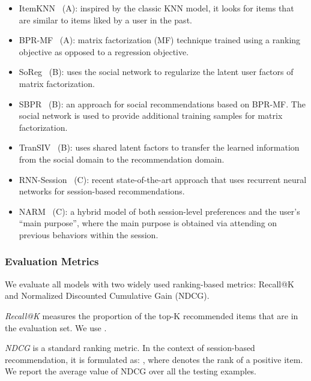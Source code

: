 \documentclass[sigconf]{acmart}
\begin{document}
\begin{itemize}[leftmargin=0.2in]
\item ItemKNN~\cite{linden2003amazon} (A): inspired by the classic KNN model, it looks for items that are similar to items liked by a user in the past.
\item BPR-MF~\cite{rendle2009bpr} (A): matrix factorization (MF) technique trained using a ranking objective as opposed to a regression objective.
\item SoReg~\cite{ma2011recommender} (B): uses the social network to regularize the latent user factors of matrix factorization.
\item SBPR~\cite{zhao2014leveraging} (B): an approach for social recommendations based on BPR-MF. The social network is used to provide additional training samples for matrix factorization.
\item TranSIV~\cite{xiao2017learning} (B): uses shared latent factors to transfer the learned information from the social domain to the recommendation domain.
\item RNN-Session~\cite{hidasi2016session} (C): recent state-of-the-art approach that uses recurrent neural networks for session-based recommendations.
\item NARM~\cite{li2017neural} (C): a hybrid model of both session-level preferences and the user's ``main purpose'', where the main purpose is obtained via attending on previous behaviors within the session.
\end{itemize}


\subsubsection{Evaluation Metrics}
We evaluate all models with two widely used ranking-based metrics: Recall@K and Normalized Discounted Cumulative Gain (NDCG).

\textit{Recall@K} measures the proportion of the top-K recommended items that are in the evaluation set. We use .





\textit{NDCG} is a standard ranking metric. In the context of session-based recommendation, it is formulated as: , where  denotes the rank of a positive item. We report the average value of NDCG over all the testing examples.
\end{document}
